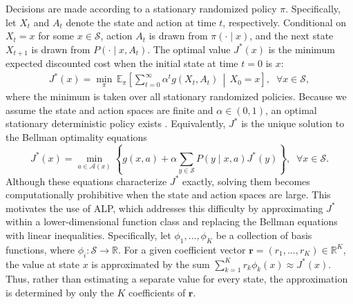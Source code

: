\documentclass[sglanonrev]{informs4}
\providecommand{\br}{\boldsymbol{r}}
\def\edits#1{{\color{black}#1}}
\begin{document}
Decisions are made according to a stationary randomized policy $\pi$. Specifically, let $X_t$ and $A_t$ denote the state and action at time $t$, respectively. Conditional on $X_t=x$ for some $x \in \mathcal S$, action $A_t$ is drawn from $\pi(\cdot\mid x)$, and the next state $X_{t+1}$ is drawn from $P(\cdot\mid x,A_t)$. The optimal value $J^*(x)$ is the minimum expected discounted cost when the initial state at \edits{time $t=0$ is $x$:}
\begin{align}
  \label{eq:optimal_value}
  J^*(x)
  =
  \min_{\pi}
  \,
  \mathbb E_\pi\left[
      \sum_{t=0}^{\infty}\alpha^t g(X_t,A_t)
      \,\middle|\,
      X_0=x
  \right],
  \;\; \forall x\in\mathcal S,
\end{align}
where the minimum is taken over all stationary randomized policies. Because \edits{we assume} the state and action spaces are finite and $\alpha\in(0,1)$, an optimal stationary deterministic policy exists \citep{puterman2014markov}.
Equivalently, $J^*$ is the unique solution to the Bellman optimality equations
\begin{equation}
\label{eq:bellman_optimality}
  J^*(x)
  =
  \min_{a\in\mathcal A(x)}
  \left\{
  g(x,a)
  +
  \alpha\sum_{y\in\mathcal S}P(y\mid x,a)J^*(y)
\right\},
\;\; \forall x\in\mathcal S.
\end{equation}
Although these equations characterize $J^*$ exactly, solving them becomes computationally prohibitive when the state and action spaces are large. \edits{This motivates the use of \ac{ALP}, which addresses this difficulty by approximating $J^*$ within a lower-dimensional function class and replacing the Bellman equations with linear inequalities.} Specifically, let $\phi_1,\ldots,\phi_K$ be a collection of basis functions, where $\phi_i : \mathcal S \rightarrow \mathbb{R}$. For a given coefficient vector $\br=(r_1,\ldots,r_K) \in \mathbb{R}^K$, the value at state $x$ is approximated by
the sum $
\sum_{k=1}^K r_k\phi_k(x)
\approx 
  J^*(x).
$
Thus, rather than estimating a separate value for every state, the approximation is determined by only the $K$ coefficients of $\br$.
\end{document}
